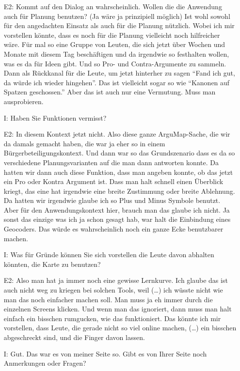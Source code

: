 \begin{itemize}
    \item[E2:] Kommt auf den Dialog an wahrscheinlich. Wollen die die Anwendung auch f{\"u}r Planung benutzen? (Ja w{\"a}re ja prinzipiell m{\"o}glich) Ist wohl sowohl f{\"u}r den angedachten Einsatz als auch f{\"u}r die Planung n{\"u}tzlich. Wobei ich mir vorstellen k{\"o}nnte, dass es noch f{\"u}r die Planung vielleicht noch hilfreicher w{\"a}re. F{\"u}r mal so eine Gruppe von Leuten, die sich jetzt {\"u}ber Wochen und Monate mit diesem Tag besch{\"a}ftigen und da irgendwie so festhalten wollen, was es da f{\"u}r Ideen gibt. Und so Pro- und Contra-Argumente zu sammeln. Dann als R{\"u}ckkanal f{\"u}r die Leute, um jetzt hinterher zu sagen "`Fand ich gut, da w{\"u}rde ich wieder hingehen"'. Das ist vielleicht sogar so wie "`Kanonen auf Spatzen geschossen."' Aber das ist auch nur eine Vermutung. Muss man ausprobieren. 
    \item[I:] Haben Sie Funktionen vermisst?
    \item[E2:] In diesem Kontext jetzt nicht. Also diese ganze ArguMap-Sache, die wir da damals gemacht haben, die war ja eher so in einem B{\"u}rgerbeteiligungskontext. Und dann war so das Grundszenario dass es da so verschiedene Planungsvarianten auf die man dann antworten konnte. Da hatten wir dann auch diese Funktion, dass man angeben konnte, ob das jetzt ein Pro oder Kontra Argument ist. Dass man halt schnell einen {\"U}berblick kriegt, das eine hat irgendwie eine breite Zustimmung oder breite Ablehnung. Da hatten wir irgendwie glaube ich so Plus und Minus Symbole benutzt. Aber f{\"u}r den Anwendungskontext hier, brauch man das glaube ich nicht. Ja sonst das einzige was ich ja schon gesagt hab, war halt die Einbindung eines Geocoders. Das w{\"u}rde es wahrscheinlich noch ein ganze Ecke benutzbarer machen.
    \item[I:] Was f{\"u}r Gr{\"u}nde k{\"o}nnen Sie sich vorstellen die Leute davon abhalten k{\"o}nnten, die Karte zu benutzen?
    \item[E2:] Also man hat ja immer noch eine gewisse Lernkurve. Ich glaube das ist auch nicht weg zu kriegen bei solchen Tools, weil (\dots) ich w{\"u}sste nicht wie man das noch einfacher machen soll. Man muss ja eh immer durch die einzelnen Screens klicken. Und wenn man das ignoriert, dann muss man halt einfach ein bisschen rumgucken, wie das funktioniert. Das k{\"o}nnte ich mir vorstellen, dass Leute, die gerade nicht so viel online machen, (\dots) ein bisschen abgeschreckt sind, und die Finger davon lassen.
    \item[I:] Gut. Das war es von meiner Seite so. Gibt es von Ihrer Seite noch Anmerkungen oder Fragen?

\end{itemize}
